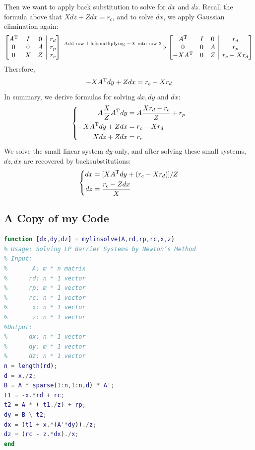 \begin{itemize}
Then we want to apply back substitution to solve for $dx$ and $dz$. Recall the formula above that $Xdz+Zdx=r_c$,
 and to solve $dx$, we apply Gaussian elimination again:
\[
\left[
\begin{array}{@{}ccc|c@{}}
A\trans&I&0&r_d\\
0&0&A&r_p\\
0&X&Z&r_c
\end{array} \right]
\xLongrightarrow{\text{Add row 1 leftmutliplying $-X$ into row 3}}
\left[
\begin{array}{@{}ccc|c@{}}
A\trans&I&0&r_d\\
0&0&A&r_p\\
-XA\trans &0&Z&r_c-Xr_d
\end{array} \right]
\]
Therefore,
\[
-XA^{\mathrm T} dy+Zdx=r_c-Xr_d
\]
In summary, we derive formulas for solving $dx,dy$ and $dx$:
\[
\left\{
\begin{aligned}
A\frac{X}{Z}A^{\mathrm T} dy&=A\frac{Xr_d-r_c}{Z}+r_p\\
-XA^{\mathrm T} dy+Zdx&=r_c-Xr_d\\
Xdz+Zdx&=r_c
\end{aligned}
\right.
\]
We solve the small linear system $dy$ only, and after solving these small systems, $dz,dx$ are recovered by backsubstitutions:
\[
\left\{
\begin{aligned}
dx&=[XA^{\mathrm T} dy+(r_c-Xr_d)]/Z\\
dz &= \frac{r_c-Zdx}{X}
\end{aligned}
\right.
\]
\end{itemize}

\clearpage
\subsection*{A Copy of my Code}
\begin{lstlisting}[language=matlab]
function [dx,dy,dz] = mylinsolve(A,rd,rp,rc,x,z)
% Usage: Solving LP Barrier Systems by Newton’s Method
% Input:
%       A: m * n matrix
%      rd: n * 1 vector
%      rp: m * 1 vector
%      rc: n * 1 vector
%       x: n * 1 vector
%       z: n * 1 vector
%Output:
%      dx: n * 1 vector
%      dy: m * 1 vector
%      dz: n * 1 vector
n = length(rd);
d = x./z;
B = A * sparse(1:n,1:n,d) * A';
t1 = -x.*rd + rc;
t2 = A * (-t1./z) + rp;
dy = B \ t2;
dx = (t1 + x.*(A'*dy))./z;
dz = (rc - z.*dx)./x;
end
\end{lstlisting}
\clearpage
